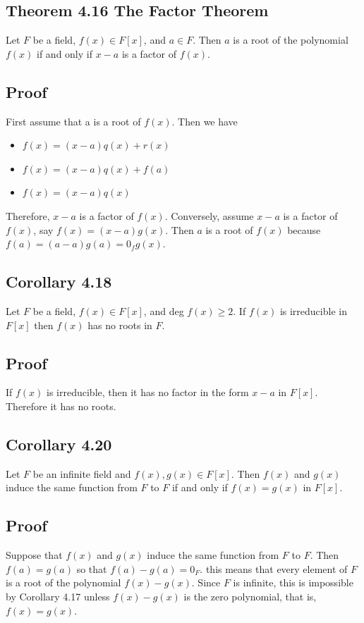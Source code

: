 \documentclass{article}
\begin{document}
\subsection*{Theorem 4.16 The Factor Theorem}
Let $F$ be a field, $f(x) \in F[x]$, and $a \in F$. Then $a$ is a root of the
polynomial $f(x)$ if and only if $x - a$ is a factor of $f(x)$.

\subsection*{Proof}
First assume that a is a root of $f(x)$. Then we have
\begin{itemize}
    \item $f(x) = (x-a)q(x) + r(x)$ 
    \item $f(x) = (x-a)q(x) + f(a)$
    \item $f(x) = (x-a)q(x)$
\end{itemize}

Therefore, $x-a$ is a factor of $f(x)$. Conversely, assume $x-a$ is a factor of $f(x)$,
say $f(x) = (x-a)g(x)$. Then $a$ is a root of $f(x)$ because $f(a) = (a-a)g(a) = 0_f g(x)$.


\subsection*{Corollary 4.18}
Let $F$ be a field, $f(x) \in F[x]$, and deg $f(x) \geq 2$. If $f(x)$ is irreducible in $F[x]$
then $f(x)$ has no roots in $F$.

\subsection*{Proof}
If $f(x)$ is irreducible, then it has no factor in the form $x-a$ in $F[x]$. Therefore it has no roots.

\subsection*{Corollary 4.20}
Let $F$ be an infinite field and $f(x), g(x) \in F[x]$. Then $f(x)$ and $g(x)$ induce the same function from $F$ to $F$ if and only if $f(x) = g(x)$ in $F[x]$.

\subsection*{Proof}
Suppose that $f(x)$ and $g(x)$ induce the same function from $F$ to $F$. Then $f(a) = g(a)$ so that $f(a) - g(a) = 0_F$. this
means that every element of $F$ is a root of the polynomial $f(x) - g(x)$. Since $F$
is infinite, this is impossible by Corollary 4.17 unless $f(x) - g(x)$ is the zero polynomial, that is, $f(x) = g(x)$.
\end{document}
